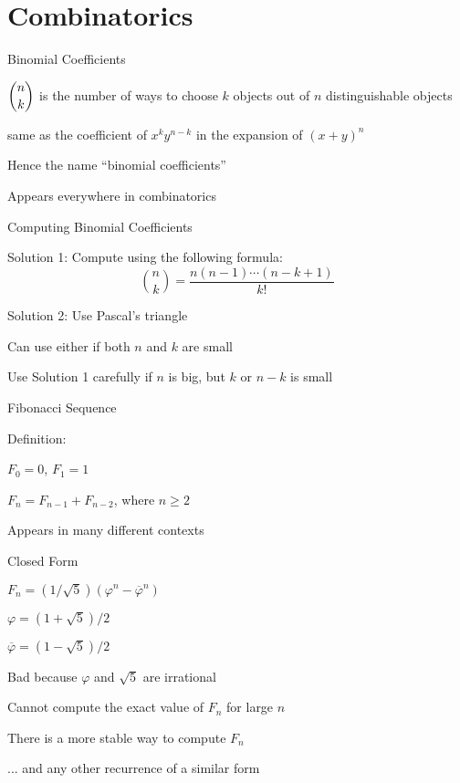 \documentclass[13pt,onlymath]{beamer}
\begin{document}
\section{Combinatorics}

\begin{frame}{Binomial Coefficients}
\BIT
\item $\dbinom{n}{k}$ is the number of ways to choose $k$ objects out of $n$ distinguishable objects
\item same as the coefficient of $x^k y^{n-k}$ in the expansion of $(x+y)^n$
\BIT
\item Hence the name ``binomial coefficients''
\EIT
\item Appears everywhere in combinatorics
\EIT
\end{frame}

\begin{frame}{Computing Binomial Coefficients}
\BIT
\item Solution 1: Compute using the following formula:
\[
\binom{n}{k} = \frac{n(n-1) \cdots (n-k+1)}{k!}
\]
\item Solution 2: Use Pascal's triangle

\item Can use either if both $n$ and $k$ are small
\item Use Solution 1 carefully if $n$ is big, but $k$ or $n-k$ is small
\EIT
\end{frame}

\begin{frame}{Fibonacci Sequence}
\BIT
\item Definition:
\BIT
\item $F_0 = 0$, $F_1 = 1$
\item $F_n = F_{n-1} + F_{n-2}$, where $n \ge 2$
\EIT
\item Appears in many different contexts
\EIT
\end{frame}

\begin{frame}{Closed Form}
\BIT
\item $F_n = (1/\sqrt{5})(\varphi^n - \overline{\varphi}^n)$
\BIT
\item $\varphi = (1+\sqrt{5})/2$
\item $\overline{\varphi} = (1-\sqrt{5})/2$
\EIT
\item Bad because $\varphi$ and $\sqrt{5}$ are irrational
\item Cannot compute the exact value of $F_n$ for large $n$

\item There is a more stable way to compute $F_n$
\BIT
\item ... and any other recurrence of a similar form
\EIT
\EIT
\end{frame}
\end{document}

